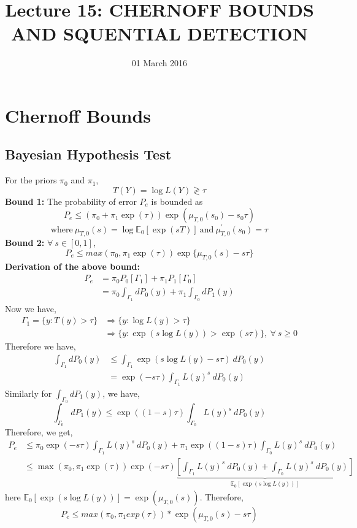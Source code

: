\documentclass[12pt,a4paper]{article}
\newcommand{\te}{\textrm}
\begin{document}
\title{Lecture 15: CHERNOFF BOUNDS AND SQUENTIAL DETECTION}
\date{01 March 2016}
\author{}
\maketitle

\section{Chernoff Bounds}
\subsection{Bayesian Hypothesis Test}
For the priors $\pi_0$ and $\pi_1$,
\begin{equation}
T(Y)=\log{L(Y)}\gtrless \tau
\end{equation}
\textbf{Bound 1:}
The probability of error $P_e$ is bounded as
\begin{equation}
P_e\leq(\pi_0+\pi_1\exp(\tau))\exp\left(\mu_{T,0}(s_0)-s_0\tau\right)
\end{equation}
$$\te{where}\ \mu_{T,0}(s)=\log\mathbb{E}_0[\exp(sT)]\ 
\te{and}\ \mu^{'}_{T,0}(s_0)=\tau$$
\textbf{Bound 2:}
$\forall\ s\in[0,1]$,
\begin{equation}
P_e\leq max(\pi_0,\pi_1\exp(\tau))\exp\{\mu_{T,0}(s)-s\tau\}
\end{equation}
\textbf{Derivation of the above bound:}
\begin{align} 
P_e &=\pi_0 P_0[\Gamma_1] + \pi_1 P_1[\Gamma_0]\\
&=\pi_0\int_{\Gamma_1}dP_0(y) + \pi_1\int_{\Gamma_0}dP_1(y)
\end{align}
Now we have,
\begin{align} 
\Gamma_1=\{ y:T(y)>\tau\} &\Rightarrow \{ y:\log{L(y)}>\tau\}\\
&\Rightarrow \{ y:\exp\left( s\log{L(y)}\right) > \exp( s\tau)\},\ \forall\ s\geq0
\end{align}
Therefore we have,
\begin{align}
\int_{\Gamma_1}dP_0(y)&\leq \int_{\Gamma_1}\exp( s\log{L(y)}-s\tau)\:dP_0(y)\\
&=\exp(-s\tau)\int_{\Gamma_1}L(y)^s \:dP_0(y)
\end{align}
Similarly for $ \int_{\Gamma_0}dP_1(y)$, we have,
\begin{equation}
\int_{\Gamma_0}dP_1(y)\leqslant\exp\left( (1-s)\tau\right)\int_{\Gamma_0}L(y)^s \:dP_0(y)
\end{equation}
Therefore, we get,
\begin{align}
P_e&\leq\pi_0\exp\left( -s\tau\right)\int_{\Gamma_1}L(y)^s \:dP_0(y)  +\pi_1\exp\left( (1-s)\tau\right)\int_{\Gamma_0}L(y)^s \:dP_0(y)\\
&\leq \max(\pi_0,\pi_1\exp( \tau))\exp( -s\tau)\underbrace{\left[\int_{\Gamma_1}L(y)^s \:dP_0(y)+\int_{\Gamma_0}L(y)^s \:dP_0(y)\right]}_{\mathbb{E}_0[\exp(s\log{L(y)})]}
\end{align}
here $\mathbb{E}_0\left[\exp(s\log{L(y)})\right] =\exp\left(\mu_{T,0}(s)\right)$.
Therefore,
\begin{equation}
P_e \leq max\left(\pi_0,\pi_1exp(\tau)\right)*\exp\left(\mu_{T,0}(s)-s\tau\right)
\end{equation}
\end{document}
